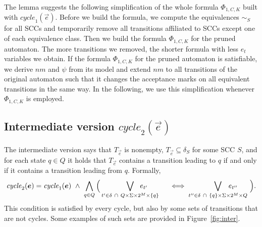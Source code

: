 \documentclass[runningheads]{llncs}
\newcommand{\rem}{\mathit{nm}}
\newcommand{\mcycle}{\mathit{cycle}}
\newcommand{\Te}{T_{\vec{e}}}
\begin{document}
The lemma suggests the following simplification of the whole formula
$\Phi_{1,C,K}$ built with $\mcycle_1(\vec{e})$. Before we build the
formula, we compute the equivalences $\sim_S$ for all SCCs and
temporarily remove all transitions affiliated to SCCs except one of
each equivalence class. Then we build the formula $\Phi_{1,C,K}$ for
the pruned automaton. The more transitions we removed, the shorter
formula with less $e_t$ variables we obtain. If the formula
$\Phi_{1,C,K}$ for the pruned automaton is satisfiable, we derive
$\rem$ and $\psi$ from its model and extend %
$\rem$ to all transitions of the original automaton such that
it changes the acceptance marks on all equivalent transitions in the
same way. In the following, we use this simplification whenever
$\Phi_{1,C,K}$ is employed.


\subsection{Intermediate version $\mcycle_2(\vec{e})$}
The intermediate version says that $\Te$ is nonempty,
$\Te\subseteq\delta_S$ for some SCC $S$, and for each state $q\in Q$
it holds that $\Te$ contains a transition leading to $q$ if and only
if it contains a transition leading from $q$. Formally,
\[
  \mcycle_2(\vec{e})=\mcycle_1(\vec{e})~\wedge~
  \bigwedge_{q\in Q}\Big(\bigvee_{t'\in\delta~\cap~Q\times\Sigma\times 2^M\times\{q\}}\hspace{-1cm}e_{t'}\hspace{1cm}\iff
  \bigvee_{t''\in\delta~\cap~\{q\}\times\Sigma\times 2^M\times Q}\hspace{-1cm}e_{t''}\hspace{6mm}\Big).
\]
This condition is satisfied by every cycle, but also by some sets of
transitions that are not cycles. Some examples of such sets are provided in Figure~\ref{fig:inter}.
\end{document}
